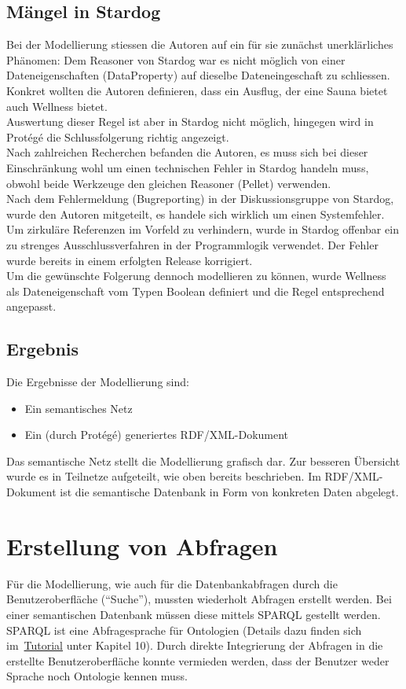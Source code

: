 \subsection{Mängel in Stardog}
\label{subsec:loesung_modellierung_maengel_stardog}
Bei der Modellierung stiessen die Autoren auf ein für sie zunächst unerklärliches Phänomen: Dem Reasoner von Stardog war es nicht möglich von einer Dateneigenschaften (DataProperty) auf dieselbe Dateneingeschaft zu schliessen. Konkret wollten die Autoren definieren, dass ein Ausflug, der eine Sauna bietet auch Wellness bietet.\\
Auswertung dieser Regel ist aber in Stardog nicht möglich, hingegen wird in Protégé die Schlussfolgerung richtig angezeigt.\\
Nach zahlreichen Recherchen befanden die Autoren, es muss sich bei dieser Einschränkung wohl um einen technischen Fehler in Stardog handeln muss, obwohl beide Werkzeuge den gleichen Reasoner (Pellet) verwenden.\\
Nach dem Fehlermeldung (Bugreporting) in der Diskussionsgruppe von Stardog, wurde den Autoren mitgeteilt, es handele sich wirklich um einen Systemfehler. Um zirkuläre Referenzen im Vorfeld zu verhindern, wurde in Stardog offenbar ein zu strenges Ausschlussverfahren in der Programmlogik verwendet. Der Fehler wurde bereits in einem erfolgten Release korrigiert.\\
Um die gewünschte Folgerung dennoch modellieren zu können, wurde Wellness als Dateneigenschaft vom Typen Boolean definiert und die Regel entsprechend angepasst.

\subsection{Ergebnis}
\label{subsec:loesung_modellierung_ergebnis}
Die Ergebnisse der Modellierung sind:
\begin{itemize}
    \item Ein semantisches Netz
    \item Ein (durch Protégé) generiertes RDF/XML-Dokument
\end{itemize}
Das semantische Netz stellt die Modellierung grafisch dar. Zur besseren Übersicht wurde es in Teilnetze aufgeteilt, wie oben bereits beschrieben. Im RDF/XML-Dokument ist die semantische Datenbank in Form von konkreten Daten abgelegt.

\section{Erstellung von Abfragen}
\label{sec:loesung_sparql}
Für die Modellierung, wie auch für die Datenbankabfragen durch die Benutzeroberfläche (``Suche''), mussten wiederholt Abfragen erstellt werden. Bei einer semantischen Datenbank müssen diese mittels SPARQL gestellt werden. SPARQL ist eine Abfragesprache für Ontologien (Details dazu finden sich im~\hyperref[sec:anhang:tutorial_dokument]{Tutorial} unter Kapitel 10). Durch direkte Integrierung der Abfragen in die erstellte Benutzeroberfläche konnte vermieden werden, dass der Benutzer weder Sprache noch Ontologie kennen muss.

